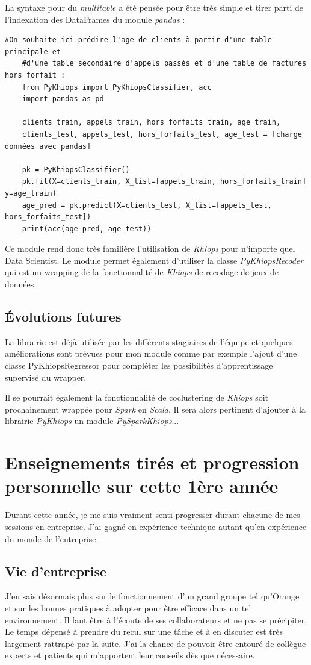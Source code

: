 \documentclass[12pt]{report}
\begin{document}
	La syntaxe pour du \textit{multitable} a été pensée pour être très simple et tirer parti de l'indexation des DataFrames du module \textit{pandas} : 
	
	\begin{lstlisting}[style=py]
	#On souhaite ici prédire l'age de clients à partir d'une table principale et
	#d'une table secondaire d'appels passés et d'une table de factures hors forfait :
	from PyKhiops import PyKhiopsClassifier, acc
	import pandas as pd
	
	clients_train, appels_train, hors_forfaits_train, age_train,
	clients_test, appels_test, hors_forfaits_test, age_test = [charge données avec pandas]
	
	pk = PyKhiopsClassifier()
	pk.fit(X=clients_train, X_list=[appels_train, hors_forfaits_train] y=age_train)
	age_pred = pk.predict(X=clients_test, X_list=[appels_test, hors_forfaits_test])
	print(acc(age_pred, age_test))
	\end{lstlisting}
	
	Ce module rend donc très familière l'utilisation de \textit{Khiops} pour n'importe quel Data Scientist.
	Le module permet également d'utiliser la classe \textit{PyKhiopsRecoder} qui est un wrapping de la fonctionnalité de \textit{Khiops} de recodage de jeux de données.
	
	\section{Évolutions futures}
	La librairie est déjà utilisée par les différents stagiaires de l'équipe et quelques améliorations sont prévues pour mon module comme par exemple l'ajout d'une classe PyKhiopsRegressor pour compléter les possibilités d'apprentissage supervisé du wrapper.
	
	Il se pourrait également la fonctionnalité de coclustering de \textit{Khiops} soit prochainement wrappée pour \textit{Spark} en \textit{Scala}. Il sera alors pertinent d'ajouter à la librairie \textit{PyKhiops} un module \textit{PySparkKhiops}...
	
	\newpage
	\chapter{Enseignements tirés et progression personnelle sur cette 1ère année}
	Durant cette année, je me suis vraiment senti progresser durant chacune de mes sessions en entreprise. J'ai gagné en expérience technique autant qu'en expérience du monde de l'entreprise.
	\section{Vie d'entreprise}
	J'en sais désormais plus sur le fonctionnement d'un grand groupe tel qu'Orange et sur les bonnes pratiques à adopter pour être efficace dans un tel environnement. Il faut être à l'écoute de ses collaborateurs et ne pas se précipiter. Le temps dépensé à prendre du recul sur une tâche et à en discuter est très largement rattrapé par la suite. J'ai la chance de pouvoir être entouré de collègue experts et patients qui m'apportent leur conseils dès que nécessaire. 
\end{document}
